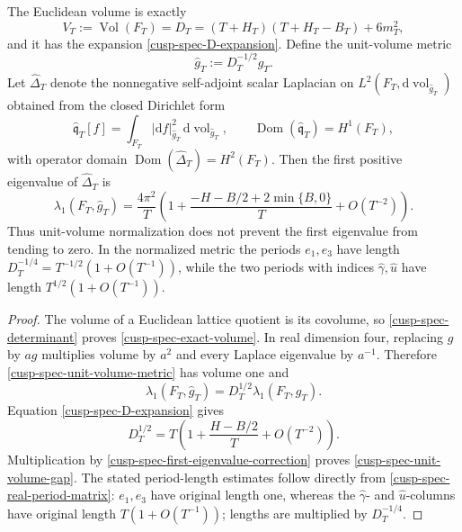 \begin{corollary}
\label{cusp-spec-unit-volume}
The Euclidean volume is exactly
\begin{equation}
 V_T:=\operatorname{Vol}(F_T)=D_T
 =(T+H_T)(T+H_T-B_T)+6m_T^2,
 \label{cusp-spec-exact-volume}
\end{equation}
and it has the expansion \cref{cusp-spec-D-expansion}.  Define the
unit-volume metric
\begin{equation}
 \widehat g_T:=D_T^{-1/2}g_T.
 \label{cusp-spec-unit-volume-metric}
\end{equation}
Let \(\widehat\Delta_T\) denote the nonnegative self-adjoint scalar
Laplacian on
\(L^2(F_T,\mathrm d\operatorname{vol}_{\widehat g_T})\) obtained from the
closed Dirichlet form
\[
 \widehat{\mathfrak q}_T[f]
 =\int_{F_T}|\mathrm df|_{\widehat g_T}^2\,
       \mathrm d\operatorname{vol}_{\widehat g_T},
 \qquad
 \operatorname{Dom}(\widehat{\mathfrak q}_T)=H^1(F_T),
\]
with operator domain
\(\operatorname{Dom}(\widehat\Delta_T)=H^2(F_T)\).  Then the first
positive eigenvalue of \(\widehat\Delta_T\) is
\begin{equation}
 \boxed{
 \lambda_1(F_T,\widehat g_T)
 =\frac{4\pi^2}{T}
 \left(1+
  \frac{-H-B/2+2\min\{B,0\}}{T}+O(T^{-2})\right).}
 \label{cusp-spec-unit-volume-gap}
\end{equation}
Thus unit-volume normalization does not prevent the first eigenvalue from
tending to zero.  In the normalized metric the periods \(e_1,e_3\) have
length \(D_T^{-1/4}=T^{-1/2}(1+O(T^{-1}))\), while the two periods with
indices \(\widehat\gamma,\widehat u\) have length
\(T^{1/2}(1+O(T^{-1}))\).
\end{corollary}

\begin{proof}
The volume of a Euclidean lattice quotient is its covolume, so
\cref{cusp-spec-determinant} proves
\cref{cusp-spec-exact-volume}.  In real dimension four, replacing \(g\) by
\(ag\) multiplies volume by \(a^2\) and every Laplace eigenvalue by
\(a^{-1}\).  Therefore \cref{cusp-spec-unit-volume-metric} has volume one
and
\[
 \lambda_1(F_T,\widehat g_T)=D_T^{1/2}\lambda_1(F_T,g_T).
\]
Equation \cref{cusp-spec-D-expansion} gives
\[
 D_T^{1/2}
 =T\left(1+\frac{H-B/2}{T}+O(T^{-2})\right).
\]
Multiplication by \cref{cusp-spec-first-eigenvalue-correction} proves
\cref{cusp-spec-unit-volume-gap}.  The stated period-length estimates follow
directly from \cref{cusp-spec-real-period-matrix}: \(e_1,e_3\) have original
length one, whereas the \(\widehat\gamma\)- and \(\widehat u\)-columns have
original length \(T(1+O(T^{-1}))\); lengths are multiplied by
\(D_T^{-1/4}\).
\end{proof}

